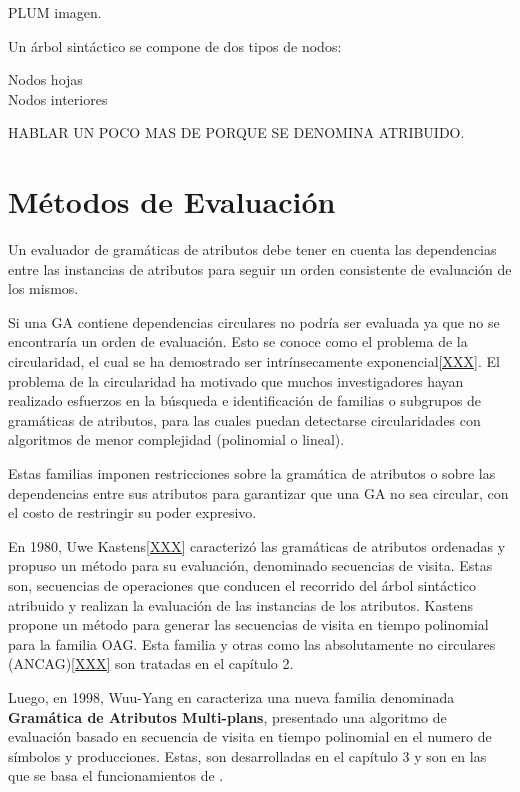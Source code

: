 PLUM imagen.

Un árbol sintáctico se compone de dos tipos de nodos:
\begin{description}
\item [Nodos hojas]
\item [Nodos interiores]
\end{description}

HABLAR UN POCO MAS DE PORQUE SE DENOMINA ATRIBUIDO.


\section{Métodos de Evaluación}

Un evaluador de gramáticas de atributos debe tener en cuenta las dependencias entre las instancias de atributos para seguir un orden consistente de evaluación de los mismos.

Si una GA contiene dependencias circulares no podría ser evaluada ya que no se encontraría un orden de evaluación. Esto se conoce como el problema de la circularidad, el cual se ha demostrado ser intrínsecamente exponencial\ref{XXX}. El problema de la circularidad ha motivado que muchos investigadores hayan realizado esfuerzos en la búsqueda e identificación de familias o subgrupos de gramáticas de atributos, para las cuales puedan detectarse circularidades con algoritmos de menor complejidad (polinomial o lineal).

Estas familias imponen restricciones sobre la gramática de atributos o sobre las dependencias entre sus atributos para garantizar que una GA no sea circular, con el costo de restringir su poder expresivo.

En 1980, Uwe Kastens\ref{XXX} caracterizó las gramáticas de atributos ordenadas y propuso un método para su evaluación, denominado secuencias de visita. Estas son, secuencias de operaciones que conducen el recorrido del árbol sintáctico atribuido y realizan la evaluación de las instancias de los atributos. Kastens propone un método para generar las secuencias de visita en tiempo polinomial para la familia OAG. Esta familia y otras como las absolutamente no circulares (ANCAG)\ref{XXX} son tratadas en el capítulo 2.

Luego, en 1998, Wuu-Yang en \cite{wuu-yang1} caracteriza una nueva familia denominada \textbf{Gramática de Atributos Multi-plans}, presentado una algoritmo de evaluación basado en secuencia de visita en tiempo polinomial en el numero de símbolos y producciones. Estas, son desarrolladas en el capítulo 3 y son en las que se basa el funcionamientos de \maggen.  

